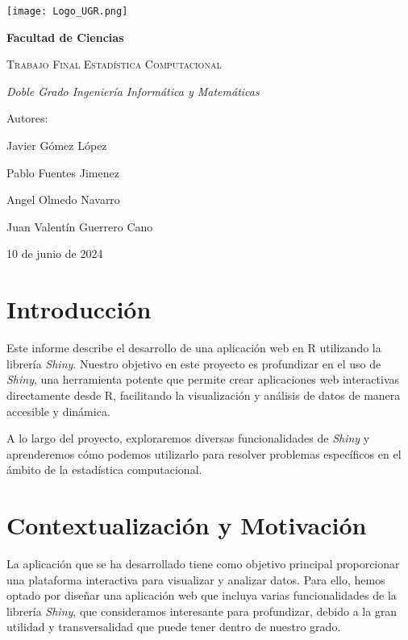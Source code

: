 \documentclass[10pt,a4paper]{article}
\begin{document}
	
\begin{titlepage}
	\centering
	{\texttt{[image: Logo\_UGR.png]}\par}
	\vspace{1cm}
	{\bfseries\Large Facultad de Ciencias \par}
	\vspace{2.5cm}
	{\scshape\Huge Trabajo Final Estadística Computacional\par}
	\vspace{3cm}
	{\itshape\Large Doble Grado Ingeniería Informática y Matemáticas}
	\vfill
	{\Large Autores: \par}
	{\Large Javier Gómez López \par}
	{\Large Pablo Fuentes Jimenez \par}
	{\Large Angel Olmedo Navarro \par}
	{\Large Juan Valentín Guerrero Cano \par}
	
	\vfill
	{\Large 10 de junio de 2024 \par}
\end{titlepage}

\section{Introducción}

\noindent Este informe describe el desarrollo de una aplicación web en R utilizando la librería \textit{Shiny}. Nuestro objetivo en este proyecto es profundizar en el uso de \textit{Shiny}, una herramienta potente que permite crear aplicaciones web interactivas directamente desde R, facilitando la visualización y análisis de datos de manera accesible y dinámica.\newline

\noindent A lo largo del proyecto, exploraremos diversas funcionalidades de \textit{Shiny} y aprenderemos cómo podemos utilizarlo para resolver problemas específicos en el ámbito de la estadística computacional.

\section{Contextualización y Motivación}
\noindent La aplicación que se ha desarrollado tiene como objetivo principal proporcionar una plataforma interactiva para visualizar y analizar datos. Para ello, hemos optado por diseñar una aplicación web que incluya varias funcionalidades de la librería \textit{Shiny}, que consideramos interesante para profundizar, debido a la gran utilidad y transversalidad que puede tener dentro de nuestro grado.\newline
\end{document}

